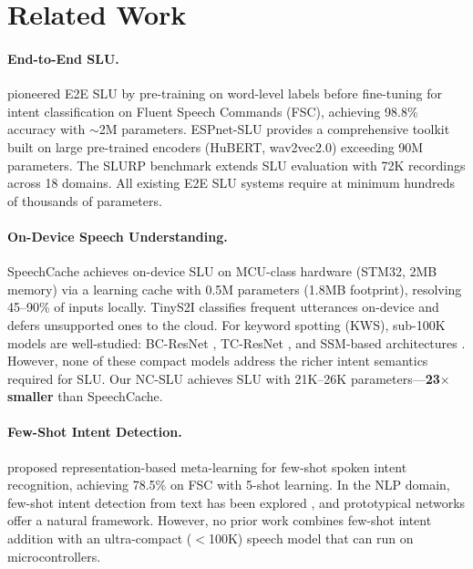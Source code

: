 \documentclass[11pt]{article}
\begin{document}
\section{Related Work}

\paragraph{End-to-End SLU.}
\citet{lugosch2019speech} pioneered E2E SLU by pre-training on word-level labels before fine-tuning for intent classification on Fluent Speech Commands (FSC), achieving 98.8\% accuracy with $\sim$2M parameters.
ESPnet-SLU \cite{arora2023espnetslu} provides a comprehensive toolkit built on large pre-trained encoders (HuBERT, wav2vec2.0) exceeding 90M parameters.
The SLURP benchmark \cite{bastianelli2020slurp} extends SLU evaluation with 72K recordings across 18 domains.
All existing E2E SLU systems require at minimum hundreds of thousands of parameters.

\paragraph{On-Device Speech Understanding.}
SpeechCache \cite{benazir2024speechcache} achieves on-device SLU on MCU-class hardware (STM32, 2MB memory) via a learning cache with 0.5M parameters (1.8MB footprint), resolving 45--90\% of inputs locally.
TinyS2I \cite{tinys2i2022} classifies frequent utterances on-device and defers unsupported ones to the cloud.
For keyword spotting (KWS), sub-100K models are well-studied: BC-ResNet \cite{kim2021bcresnet}, TC-ResNet \cite{choi2019temporal}, and SSM-based architectures \cite{gu2024mamba}.
However, none of these compact models address the richer intent semantics required for SLU.
Our NC-SLU achieves SLU with 21K--26K parameters---\textbf{23$\times$ smaller} than SpeechCache.

\paragraph{Few-Shot Intent Detection.}
\citet{mittal2020fewshot} proposed representation-based meta-learning for few-shot spoken intent recognition, achieving 78.5\% on FSC with 5-shot learning.
In the NLP domain, few-shot intent detection from text has been explored \cite{zhang2020fewshot,xia2021incremental}, and prototypical networks \cite{snell2017prototypical} offer a natural framework.
However, no prior work combines few-shot intent addition with an ultra-compact ($<$100K) speech model that can run on microcontrollers.
\end{document}
